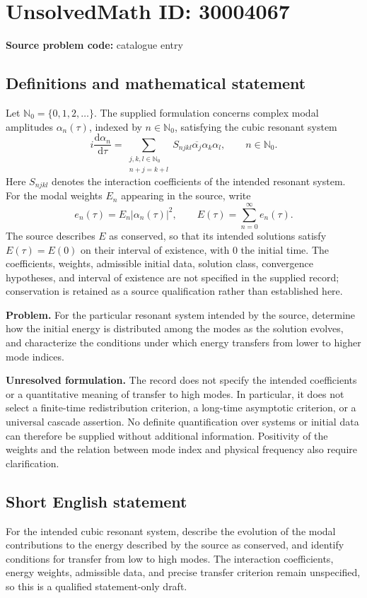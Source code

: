 \documentclass[11pt]{article}
\newcommand{\N}{\mathbb{N}}
\begin{document}
\section*{UnsolvedMath ID: 30004067}
\textbf{Source problem code:} catalogue entry
\subsection{Definitions and mathematical statement}
Let \(\N_0=\{0,1,2,\ldots\}\). The supplied formulation concerns complex modal amplitudes \(\alpha_n(\tau)\), indexed by \(n\in\N_0\), satisfying the cubic resonant system
\[
 i\frac{\mathrm d\alpha_n}{\mathrm d\tau}
 =\sum_{\substack{j,k,l\in\N_0\\ n+j=k+l}}
 S_{njkl}\overline{\alpha_j}\alpha_k\alpha_l,
 \qquad n\in\N_0.
\]
Here \(S_{njkl}\) denotes the interaction coefficients of the intended resonant system. For the modal weights \(E_n\) appearing in the source, write
\[
 e_n(\tau)=E_n|\alpha_n(\tau)|^2,
 \qquad E(\tau)=\sum_{n=0}^{\infty}e_n(\tau).
\]
The source describes \(E\) as conserved, so that its intended solutions satisfy \(E(\tau)=E(0)\) on their interval of existence, with \(0\) the initial time. The coefficients, weights, admissible initial data, solution class, convergence hypotheses, and interval of existence are not specified in the supplied record; conservation is retained as a source qualification rather than established here.

\textbf{Problem.} For the particular resonant system intended by the source, determine how the initial energy is distributed among the modes as the solution evolves, and characterize the conditions under which energy transfers from lower to higher mode indices.

\textbf{Unresolved formulation.} The record does not specify the intended coefficients or a quantitative meaning of transfer to high modes. In particular, it does not select a finite-time redistribution criterion, a long-time asymptotic criterion, or a universal cascade assertion. No definite quantification over systems or initial data can therefore be supplied without additional information. Positivity of the weights and the relation between mode index and physical frequency also require clarification.
\subsection{Short English statement}
For the intended cubic resonant system, describe the evolution of the modal contributions to the energy described by the source as conserved, and identify conditions for transfer from low to high modes. The interaction coefficients, energy weights, admissible data, and precise transfer criterion remain unspecified, so this is a qualified statement-only draft.
\end{document}
